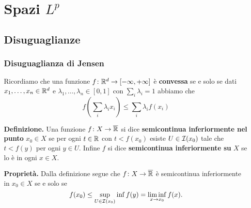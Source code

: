 %
%

\chapter{Spazi $L^p$}

\section{Disuguaglianze}

\subsection{Disuguaglianza di Jensen}

Ricordiamo che una funzione $f \colon \mathbb R^d \to [-\infty, +\infty]$ è \textbf{convessa} se e solo se dati $x_1, \dots, x_n \in \mathbb R^d$ e $\lambda_1, \dots, \lambda_n \in [0, 1]$ con $\sum_i \lambda_i = 1$ abbiamo che
$$
	f \left(\sum_i \lambda_i x_i \right) \leq \sum_i \lambda_i f(x_i)
$$

\textbf{Definizione.} Una funzione $f \colon X \to \overline{\mathbb R}$ si dice \textbf{semicontinua inferiormente nel punto} $x_0 \in X$ se per ogni $t \in \mathbb R$ con $t < f(x_0)$ esiste $U \in \mathcal{I}(x_0)$ tale che $t < f(y)$ per ogni $y \in U$. Infine $f$ si dice \textbf{semicontinua inferiormente su} $X$ se lo è in ogni $x \in X$.

\textbf{Proprietà.} Dalla definizione segue che $f \colon X \to \overline{\mathbb R}$ è semicontinua inferiormente in $x_0 \in X$ se e solo se
$$
	f(x_0) \leq \sup_{U \in \mathcal{I}(x_0)} \inf f(y) = \liminf_{x \to x_0} f(x).
$$


